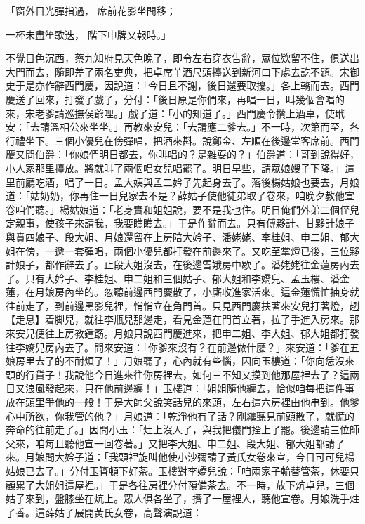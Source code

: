 「窗外日光彈指過，  席前花影坐間移；

一杯未盡笙歌迭，  階下申牌又報時。」

不覺日色沉西，蔡九知府見天色晚了，即令左右穿衣告辭，眾位欵留不住，俱送出大門而去，隨即差了兩名吏典，把卓席羊酒尺頭擡送到新河口下處去訖不題。宋御史于是亦作辭西門慶，因說道：「今日且不謝，後日還要取擾。」各上轎而去。西門慶送了回來，打發了戲子，分付：「後日原是你們來，再唱一日，叫幾個會唱的來，宋老爹請巡撫侯爺哩。」戲了道：「小的知道了。」西門慶令攢上酒卓，使玳安：「去請溫相公來坐坐。」再教來安兒：「去請應二爹去。」不一時，次第而至，各行禮坐下。三個小優兒在傍彈唱，把酒來斟。說鄭金、左順在後邊堂客席前。西門慶又問伯爵：「你娘們明日都去，你叫唱的？是雜耍的？」伯爵道：「哥到說得好，小人家那里擡放。將就叫了兩個唱女兒唱罷了。明日早些，請眾娘嫂子下降。」這里前廳吃酒，唱了一日。孟大姨與孟二妗子先起身去了。落後楊姑娘也要去，月娘道：「姑奶奶，你再住一日兒家去不是？薛姑子使他徒弟取了卷來，咱晚夕教他宣卷咱們聽。」楊姑娘道：「老身實和姐姐說，要不是我也住。明日俺們外弟二個侄兒定親事，使孩子來請我，我要瞧瞧去。」于是作辭而去。只有傅夥計、甘夥計娘子與賁四娘子、段大姐、月娘還留在上房陪大妗子、潘姥姥、李桂姐、申二姐、郁大姐在傍，一遞一套彈唱，兩個小優兒都打發在前邊來了。又吃至掌燈已後，三位夥計娘子，都作辭去了。止段大姐沒去，在後邊雪娥房中歇了。潘姥姥往金蓮房內去了。只有大妗子、李桂姐、申二姐和三個姑子、郁大姐和李嬌兒、孟玉樓、潘金蓮，在月娘房內坐的。忽聽前邊西門慶散了，小廝收進家活來。這金蓮慌忙抽身就往前走了，到前邊黑影兒裡，悄悄立在角門首。只見西門慶扶著來安兒打著燈，趔【走息】着脚兒，就往李瓶兒那邊走，看見金蓮在門首立著，拉了手進入房來。那來安兒便往上房教鍾筯。月娘只說西門慶進來，把申二姐、李大姐、郁大姐都打發往李嬌兒房內去了。問來安道：「你爹來沒有？在前邊做什麼？」來安道：「爹在五娘房里去了的不耐煩了！」月娘聽了，心內就有些惱，因向玉樓道：「你向恁沒來頭的行貨子！我說他今日進來往你房裡去，如何三不知又摸到他那屋裡去了？這兩日又浪風發起來，只在他前邊纏！」玉樓道：「姐姐隨他纏去，恰似咱每把這件事放在頭里爭他的一般！于是大師父說笑話兒的來頭，左右這六房裡由他串到。他爹心中所欲，你我管的他？」月娘道：「乾淨他有了話？剛纔聽見前頭散了，就慌的奔命的往前走了。」因問小玉：「灶上沒人了，與我把儀門拴上了罷。後邊請三位師父來，咱每且聽他宣一回卷著。」又把李大姐、申二姐、段大姐、郁大姐都請了來。月娘問大妗子道：「我頭裡旋叫他使小沙彌請了黃氏女卷來宣，今日可可兒楊姑娘已去了。」分付玉筲頓下好茶。玉樓對李嬌兒說：「咱兩家子輪替管茶，休要只顧累了大姐姐這屋裡。」于是各往房裡分付預備茶去。不一時，放下炕卓兒，三個姑子來到，盤膝坐在炕上。眾人俱各坐了，擠了一屋裡人，聽他宣卷。月娘洗手炷了香。這薛姑子展開黃氏女卷，高聲演說道：

